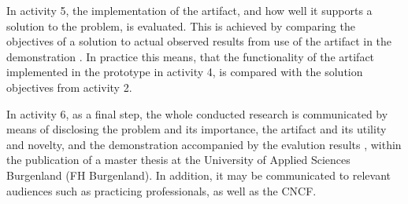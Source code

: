 \noindent
In activity 5,
the implementation of the artifact,
and how well it supports a solution to the problem,
is evaluated.
This is achieved by
comparing the objectives of a solution to actual observed results
from use of the artifact in the demonstration
\autocite{designScienceResearchMethodologyForInformationSystemsResearch}.
In practice this means, that
the functionality of the artifact implemented in the prototype in activity 4,
is compared with the solution objectives from activity 2.
\bigskip

\noindent
In activity 6, as a final step,
the whole conducted research is communicated by means of
disclosing
the problem and its importance,
the artifact and its utility and novelty,
and the demonstration accompanied by the evalution results
\autocite{designScienceResearchMethodologyForInformationSystemsResearch},
within the publication of a master thesis at
the University of Applied Sciences Burgenland (FH Burgenland).
In addition, it may be communicated to relevant audiences such as practicing professionals,
as well as the CNCF.

\pagebreak




















